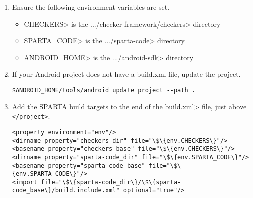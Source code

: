 \begin{enumerate}
\item
Ensure the following environment variables are set. 

\begin{itemize}
\item
\<CHECKERS> is the
\<.../checker-framework/checkers> directory

\item
\<SPARTA\_CODE> is the \<.../sparta-code> directory

\item
\<ANDROID\_HOME> is the \<.../android-sdk> directory

\end{itemize}

\item
If your Android project does not have a build.xml file, update the project.

\begin{Verbatim}
$ANDROID_HOME/tools/android update project --path .
\end{Verbatim}

\item
Add the SPARTA build targets to the end of the \<build.xml>
 file, just above \verb|</project>|.


\begin{Verbatim}
<property environment="env"/>
<dirname property="checkers_dir" file="\$\{env.CHECKERS\}"/>
<basename property="checkers_base" file="\$\{env.CHECKERS\}"/>
<dirname property="sparta-code_dir" file="\$\{env.SPARTA_CODE\}"/>
<basename property="sparta-code_base" file="\$\{env.SPARTA_CODE\}"/>
<import file="\$\{sparta-code_dir\}/\$\{sparta-code_base\}/build.include.xml" optional="true"/>
\end{Verbatim}

\end{enumerate}


